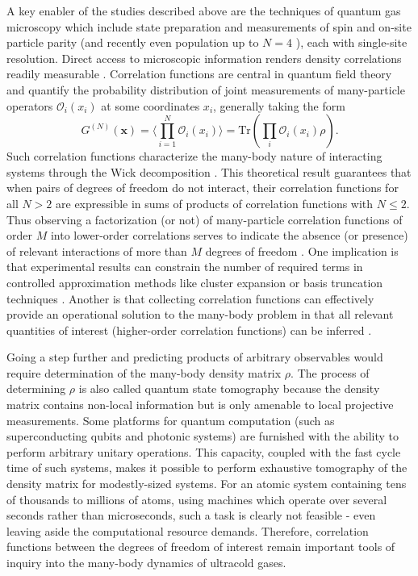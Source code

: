 	A key enabler of the studies described above are the techniques of quantum gas microscopy \cite{Bakr09,Cheuk15,Endres11,Haller15,Miranda15,Parsons15,Rispoli19,Sherson10,Miranda17,Preiss15a} which include state preparation and measurements of spin and on-site particle parity (and recently even population up to $N=4$ \cite{Preiss15a}), each with single-site resolution.
	Direct access to microscopic information renders density correlations readily measurable \cite{Endres11,Rispoli19}.
	Correlation functions are central in quantum field theory and quantify the probability distribution of joint measurements of many-particle operators $\mathcal{O}_i(x_i)$ at some coordinates $x_i$, generally taking the form
	\begin{equation}
		G^{(N)}(\textbf{x}) = \langle \prod_{i=1}^{N}\mathcal{O}_i(x_i)\rangle = \textrm{Tr}\left(\prod_i\mathcal{O}_i(x_i) \rho\right).
	\end{equation}
	Such correlation functions characterize the many-body nature of interacting systems through the Wick decomposition \cite{Wick50}.
	This theoretical result guarantees that when pairs of degrees of freedom do not interact, their correlation functions for all $N>2$ are expressible in sums of products of correlation functions with $N\leq2$.
	Thus observing a factorization (or not) of many-particle correlation functions of order $M$ into lower-order correlations serves to indicate the absence (or presence) of relevant interactions of more than $M$ degrees of freedom \cite{Schweigler17}.
	One implication is that experimental results can constrain the number of required terms in controlled approximation methods like cluster expansion or basis truncation techniques \cite{Hodgman17}.
	Another is that collecting correlation functions can effectively provide an operational solution to the many-body problem in that all relevant quantities of interest (higher-order correlation functions) can be inferred \cite{Schweigler17,Hodgman17}.

	Going a step further and predicting products of arbitrary observables would require determination of the many-body density matrix $\rho$.
	The process of determining $\rho$ is also called quantum state tomography because the density matrix contains non-local information but is only amenable to local projective measurements.
	Some platforms for quantum computation (such as superconducting qubits and photonic systems) are furnished with the ability to perform arbitrary unitary operations. 
	This capacity, coupled with the fast cycle time of such systems, makes it possible to perform exhaustive tomography of the density matrix for modestly-sized systems.
	For an atomic system containing tens of thousands to millions of atoms, using machines which operate over several seconds rather than microseconds, such a task is clearly not feasible - even leaving aside the computational resource demands.
	Therefore, correlation functions between the degrees of freedom of interest remain important tools of inquiry into the many-body dynamics of ultracold gases.
	
